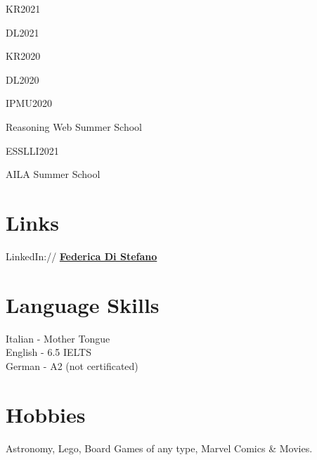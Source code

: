 \documentclass[letterpaper]{deedy-resume} %
\begin{document}
\begin{minipage}[t]{0.33\textwidth}

\vspace{0.5cm}
\begin{tightitemize}
\item KR2021
\item DL2021
\item KR2020
\item DL2020
\item IPMU2020
\end{tightitemize}
\sectionspace
{}
\begin{tightitemize}
\item Reasoning Web Summer School
\item ESSLLI2021
\item AILA Summer School
\end{tightitemize}
\sectionspace
\section{Links} 

LinkedIn:// \href{https://www.linkedin.com/in/federica-di-stefano-a04673194/}{\bf Federica Di Stefano} \\

\sectionspace %
\section{Language Skills}
Italian - Mother Tongue \\
English - 6.5 IELTS\\
German - A2 (not certificated) 
\sectionspace
\section{Hobbies}
Astronomy, 
Lego\textregistered, 
Board Games of any type,
Marvel Comics \& Movies.



\end{minipage}
\end{document}
